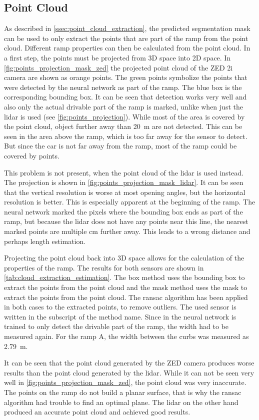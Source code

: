 \subsection{Point Cloud}
As described in \cref{ssec:point_cloud_extraction}, the predicted segmentation mask can be used to only extract the points that are part of the ramp from the point cloud.
Different ramp properties can then be calculated from the point cloud.
In a first step, the points must be projected from 3D space into 2D space.
In \cref{fig:points_projection_mask_zed} the projected point cloud of the ZED 2i camera are shown as orange points.
The green points symbolize the points that were detected by the neural network as part of the ramp.
The blue box is the corresponding bounding box.
It can be seen that detection works very well and also only the actual drivable part of the ramp is marked, unlike when just the \gls{lidar} is used (see \cref{fig:points_projection}).
While most of the area is covered by the point cloud, object further away than \SI{20}{\metre} are not detected.
This can be seen in the area above the ramp, which is too far away for the sensor to detect.
But since the car is not far away from the ramp, most of the ramp could be covered by points.\par
This problem is not present, when the point cloud of the \gls{lidar} is used instead.
The projection is shown in \cref{fig:points_projection_mask_lidar}.
It can be seen that the vertical resolution is worse at most opening angles, but the horizontal resolution is better.
This is especially apparent at the beginning of the ramp.
The neural network marked the pixels where the bounding box ends as part of the ramp, but because the \gls{lidar} does not have any points near this line, the nearest marked points are multiple \si{\cm} further away.
This leads to a wrong distance and perhaps length estimation.\par
Projecting the point cloud back into 3D space allows for the calculation of the properties of the ramp.
The results for both sensors are shown in \cref{tab:cloud_extraction_estimation}.
The box method uses the bounding box to extract the points from the point cloud and the mask method uses the mask to extract the points from the point cloud.
The \gls{ransac} algorithm has been applied in both cases to the extracted points, to remove outliers.
The used sensor is written in the subscript of the method name.
Since in the neural network is trained to only detect the drivable part of the ramp, the width had to be measured again.
For the ramp A, the width between the curbs was measured as \SI{2.79}{\metre}.\par
It can be seen that the point cloud generated by the ZED camera produces worse results than the point cloud generated by the lidar.
While it can not be seen very well in \cref{fig:points_projection_mask_zed}, the point cloud was very inaccurate.
The points on the ramp do not build a planar surface, that is why the \gls{ransac} algorithm had trouble to find an optimal plane.
The \gls{lidar} on the other hand produced an accurate point cloud and achieved good results.

